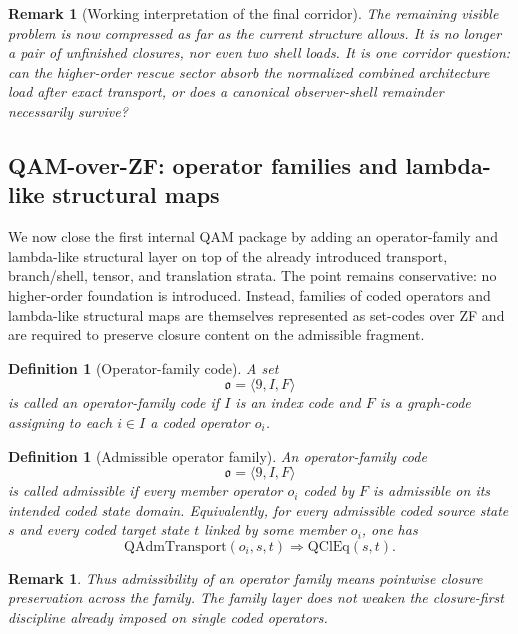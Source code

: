 \documentclass[12pt,a4paper]{article}
\newtheorem{definition}[theorem]{Definition}
\newtheorem{remark}[theorem]{Remark}
\begin{document}
\begin{remark}[Working interpretation of the final corridor]
The remaining visible problem is now compressed as far as the current structure allows. It is no longer a pair of unfinished closures, nor even two shell loads. It is one corridor question: can the higher-order rescue sector absorb the normalized combined architecture load after exact transport, or does a canonical observer-shell remainder necessarily survive?
\end{remark}



\subsection{QAM-over-ZF: operator families and lambda-like structural maps}

We now close the first internal QAM package by adding an operator-family and lambda-like structural layer on top of the already introduced transport, branch/shell, tensor, and translation strata. The point remains conservative: no higher-order foundation is introduced. Instead, families of coded operators and lambda-like structural maps are themselves represented as set-codes over ZF and are required to preserve closure content on the admissible fragment.

\begin{definition}[Operator-family code]
A set
\[
\mathfrak{o}=\langle 9,I,F\rangle
\]
is called an \emph{operator-family code} if $I$ is an index code and $F$ is a graph-code assigning to each $i\in I$ a coded operator $o_i$.
\end{definition}

\begin{definition}[Admissible operator family]
An operator-family code
\[
\mathfrak{o}=\langle 9,I,F\rangle
\]
is called \emph{admissible} if every member operator $o_i$ coded by $F$ is admissible on its intended coded state domain. Equivalently, for every admissible coded source state $s$ and every coded target state $t$ linked by some member $o_i$, one has
\[
\mathrm{QAdmTransport}(o_i,s,t)
\Longrightarrow
\mathrm{QClEq}(s,t).
\]
\end{definition}

\begin{remark}
Thus admissibility of an operator family means pointwise closure preservation across the family. The family layer does not weaken the closure-first discipline already imposed on single coded operators.
\end{remark}
\end{document}
